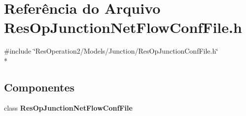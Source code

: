 \section{Referência do Arquivo Res\+Op\+Junction\+Net\+Flow\+Conf\+File.\+h}
\label{_res_op_junction_net_flow_conf_file_8h}
{\ttfamily \#include \char`\"{}Res\+Operation2/\+Models/\+Junction/\+Res\+Op\+Junction\+Conf\+File.\+h\char`\"{}}\\*
\subsection*{Componentes}
\begin{DoxyCompactItemize}
\item 
class {\bf Res\+Op\+Junction\+Net\+Flow\+Conf\+File}
\end{DoxyCompactItemize}
